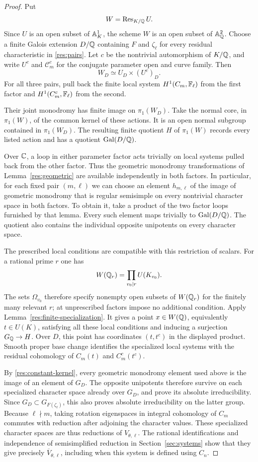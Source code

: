 \begin{proof}
Put
\[
 W=\operatorname{Res}_{K/\mathbb Q}U.
\]
Since $U$ is an open subset of $\mathbb A^1_K$, the scheme $W$ is an open
subset of $\mathbb A^2_\mathbb Q$.  Choose a finite Galois extension $D/\mathbb Q$
containing $F$ and $\zeta_\ell$ for every residual characteristic
in \eqref{res:pairs}.  Let $c$ be the nontrivial automorphism of
$K/\mathbb Q$, and write $U^c$ and $\mathcal C_m^c$ for the conjugate
parameter open and curve family.  Then
\[
 W_D\simeq U_D\times (U^c)_D.
\]
For all three pairs, pull back the finite local system
$H^1(C_m,\mathbb F_\ell)$ from the first factor and
$H^1(C_m^c,\mathbb F_\ell)$ from the second.

Their joint monodromy has finite image on $\pi_1(W_D)$.  Take the
normal core, in $\pi_1(W)$, of the common kernel of these actions.
It is an open normal subgroup contained in $\pi_1(W_D)$.
The resulting finite quotient $H$ of $\pi_1(W)$ records every
listed action and has a quotient $\operatorname{Gal}(D/\mathbb Q)$.

Over $\mathbb C$, a loop in either parameter factor acts trivially on
local systems pulled back from the other factor.  Thus the
geometric monodromy transformations of Lemma~\ref{res:geometric}
are available independently in both factors.  In particular, for
each fixed pair $(m,\ell)$ we can choose an element $h_{m,\ell}$
of the image of geometric monodromy that is regular semisimple
on every nontrivial character space in both factors.  To obtain
it, take a product of the two factor loops furnished by that
lemma.  Every such element maps trivially to $\operatorname{Gal}(D/\mathbb Q)$.
The quotient also contains the individual opposite unipotents
on every character space.

The prescribed local conditions are compatible with this
restriction of scalars.  For a rational prime $r$ one has
\[
 W(\mathbb Q_r)=\prod_{v_0\mid r}U(K_{v_0}).
\]
The sets $\Omega_{v_0}$ therefore specify nonempty open subsets
of $W(\mathbb Q_r)$ for the finitely many relevant $r$; at unprescribed
factors impose no additional condition.  Apply
Lemma~\ref{res:finite-specialization}.  It gives a point
$x\in W(\mathbb Q)$, equivalently $t\in U(K)$, satisfying all these
local conditions and inducing a surjection $G_\mathbb Q\to H$.
Over $D$, this point has coordinates $(t,t^c)$ in the displayed
product. Smooth proper base change identifies the specialized
local systems with the residual cohomology of $C_m(t)$ and
$C_m^c(t^c)$.

By \eqref{res:constant-kernel}, every geometric monodromy element
used above is the image of an element of $G_D$.  The opposite
unipotents therefore survive on each specialized character space
already over $G_D$, and prove its absolute irreducibility.
Since $G_D\subset G_{F(\zeta_\ell)}$, this also proves absolute
irreducibility on the latter group.  Because $\ell\nmid m$,
taking rotation eigenspaces in integral cohomology of $C_m$
commutes with reduction after adjoining the character values.
These specialized character spaces are thus reductions of
$V_{\theta,\ell}$.  The rational identifications and independence
of semisimplified reduction in Section~\ref{sec:systems} show
that they give precisely $\overline V_{\theta,\ell}$, including
when this system is defined using $C_n$.


\end{proof}
